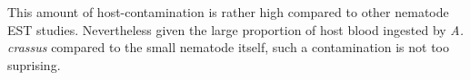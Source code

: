 \documentclass[12pt,a4paper]{article}
\begin{document}
This amount of host-contamination is rather high compared to other
nematode EST studies. Nevertheless given the large proportion of host
blood ingested by \textit{A. crassus} compared to the small nematode
itself, such a contamination is not too suprising.



\newpage



\end{document}
